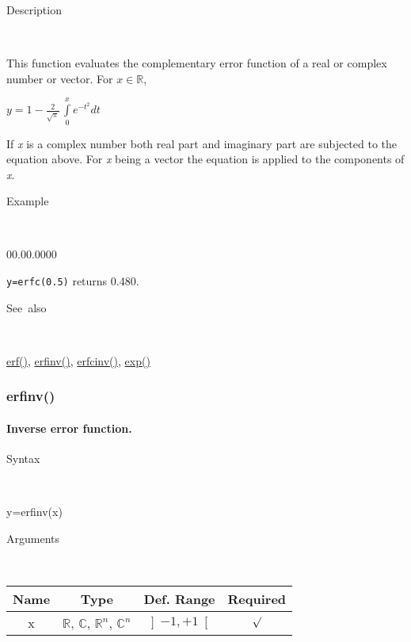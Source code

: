 \begin{description}
\item [Description]~
\end{description}
This function evaluates the complementary error function of a real
or complex number or vector. For $x\in\mathbb{R}$,

\medskip{}
$y={\displaystyle 1-\frac{2}{\sqrt{\pi}}\,\int\limits _{0}^{x}e^{-t^{2}}dt}$
\medskip{}

\noindent If \textit{x} is a complex number both real part and imaginary
part are subjected to the equation above. For \textit{x} being a vector
the equation is applied to the components of \textit{x}.

\begin{description}
\item [Example]~
\end{description}
\begin{lyxlist}{00.00.0000}
\item [\texttt{y=erfc(0.5)}]returns 0.480.
\end{lyxlist}
\begin{description}
\item [See~also]~
\end{description}
\textcolor{blue}{\hyperlink{erf}{erf()}}\textcolor{black}{,} \textcolor{blue}{\hyperlink{erfinv}{erfinv()}}\textcolor{black}{,}
\textcolor{blue}{\hyperlink{erfcinv}{erfcinv()}}\textcolor{black}{,}
\textcolor{blue}{\hyperlink{exp}{exp()}}


\newpage
\subsubsection*{\hypertarget{erfinv}{}{\Large erfinv()}}


\paragraph{\label{par:Inverse-error-function}Inverse error function.}

\begin{description}
\item [Syntax]~
\end{description}
y=erfinv(x)

\begin{description}
\item [Arguments]~
\end{description}
\begin{tabular}{|c|c|c|c|}
\hline 
Name&
Type&
Def. Range&
Required\tabularnewline
\hline
\hline 
x&
$\mathbb{R}$, $\mathbb{C}$, $\mathbb{R}^{n}$, $\mathbb{C}^{n}$&
$\left]-1,+1\right[$&
$\surd$\tabularnewline
\hline
\end{tabular}

